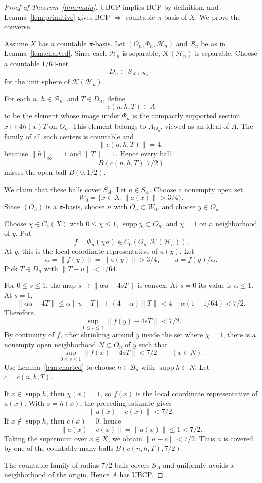 \documentclass[11pt]{article}
\newcommand{\Kcal}{\mathcal K}
\newcommand{\supp}{\operatorname{supp}}
\begin{document}
\begin{proof}[Proof of Theorem~\ref{thm:main}]
UBCP implies BCP by definition, and Lemma~\ref{lem:primitive} gives
BCP \(\Rightarrow\) countable \(\pi\)-basis of \(X\).  We prove the converse.

Assume \(X\) has a countable \(\pi\)-basis.  Let
\((O_n,\Phi_n,\mathcal H_n)\) and \(\mathcal B_n\) be as in
Lemma~\ref{lem:charted}.  Since each \(\mathcal H_n\) is separable,
\(\Kcal(\mathcal H_n)\) is separable.  Choose a countable \(1/64\)-net
\[
        D_n\subset S_{\Kcal(\mathcal H_n)}
\]
for the unit sphere of \(\Kcal(\mathcal H_n)\).

For each \(n\), \(h\in\mathcal B_n\), and \(T\in D_n\), define
\[
        c(n,h,T)\in A
\]
to be the element whose image under \(\Phi_n\) is the compactly supported
section \(x\mapsto 4h(x)T\) on \(O_n\).  This element belongs to \(A_{O_n}\),
viewed as an ideal of \(A\).  The family of all such centers is countable and
\[
        \|c(n,h,T)\|=4,
\]
because \(\|h\|_\infty=1\) and \(\|T\|=1\).  Hence every ball
\[
        B(c(n,h,T),7/2)
\]
misses the open ball \(B(0,1/2)\).

We claim that these balls cover \(S_A\).  Let \(a\in S_A\).  Choose a
nonempty open set
\[
        W_0=\{x\in X:\|a(x)\|>3/4\}.
\]
Since \((O_n)\) is a \(\pi\)-basis, choose \(n\) with \(O_n\subset W_0\), and
choose \(y\in O_n\).

Choose \(\chi\in C_c(X)\) with \(0\le\chi\le1\), \(\supp\chi\subset O_n\), and
\(\chi=1\) on a neighborhood of \(y\).  Put
\[
        f=\Phi_n(\chi a)\in C_0(O_n,\Kcal(\mathcal H_n)).
\]
At \(y\), this is the local coordinate representative of \(a(y)\).  Let
\[
        \alpha=\|f(y)\|=\|a(y)\|>3/4,\qquad u=f(y)/\alpha.
\]
Pick \(T\in D_n\) with \(\|T-u\|<1/64\).

For \(0\le s\le1\), the map \(s\mapsto \|\alpha u-4sT\|\) is convex.  At
\(s=0\) its value is \(\alpha\le1\).  At \(s=1\),
\[
        \|\alpha u-4T\|
        \le \alpha\|u-T\|+(4-\alpha)\|T\|
        < 4-\alpha(1-1/64)
        < 7/2.
\]
Therefore
\[
        \sup_{0\le s\le1}\|f(y)-4sT\|<7/2.
\]
By continuity of \(f\), after shrinking around \(y\) inside the set where
\(\chi=1\), there is a nonempty open neighborhood \(N\subset O_n\) of \(y\)
such that
\[
        \sup_{0\le s\le1}\|f(x)-4sT\|<7/2
        \qquad (x\in N).
\]
Use Lemma~\ref{lem:charted} to choose \(h\in\mathcal B_n\) with
\(\supp h\subset N\).  Let \(c=c(n,h,T)\).

If \(x\in\supp h\), then \(\chi(x)=1\), so \(f(x)\) is the local coordinate
representative of \(a(x)\).  With \(s=h(x)\), the preceding estimate gives
\[
        \|a(x)-c(x)\|<7/2.
\]
If \(x\notin\supp h\), then \(c(x)=0\), hence
\[
        \|a(x)-c(x)\|=\|a(x)\|\le1<7/2.
\]
Taking the supremum over \(x\in X\), we obtain \(\|a-c\|<7/2\).  Thus
\(a\) is covered by one of the countably many balls \(B(c(n,h,T),7/2)\).

The countable family of radius \(7/2\) balls covers \(S_A\) and uniformly
avoids a neighborhood of the origin.  Hence \(A\) has UBCP.
\end{proof}
\end{document}
